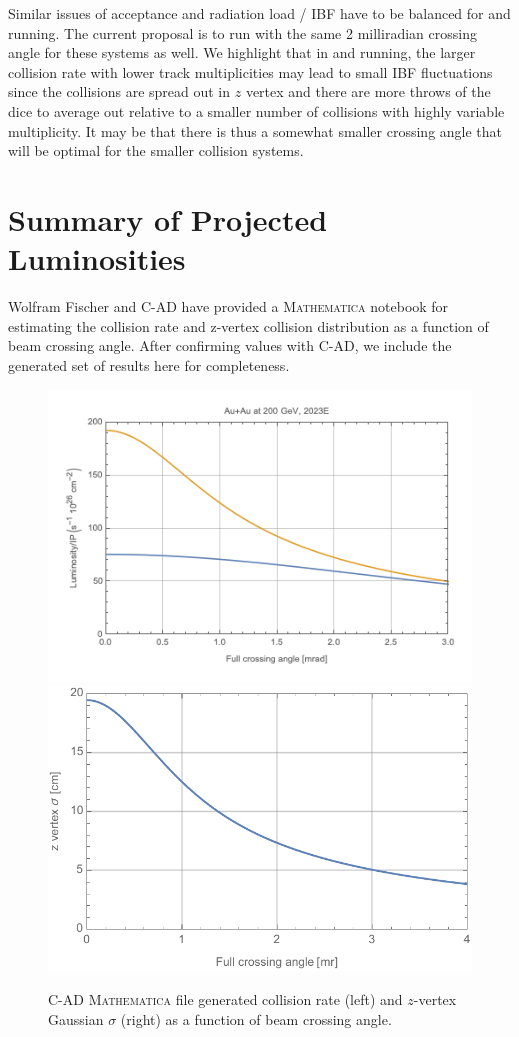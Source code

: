 Similar issues of acceptance and radiation load / IBF have to be balanced for \pp and \pau running.   The current proposal is to run with the same 2 milliradian crossing angle for these systems as well.    We highlight that in \pp and \pau running, the larger collision rate with lower track multiplicities may lead to small IBF fluctuations since the collisions are spread out in $z$ vertex and there are more throws of the dice to average out relative to a smaller number of \auau collisions with highly variable multiplicity.     It may be that there is thus a somewhat smaller crossing angle that will be optimal for the smaller collision systems.    

\section{Summary of Projected Luminosities} 

Wolfram Fischer and C-AD have provided a {\textsc{Mathematica}} notebook for estimating the collision rate and z-vertex collision distribution as a function of beam crossing angle.  After confirming values with C-AD, we include the generated set of results here for completeness.    

\begin{figure}[h!]
    \centering
        \includegraphics[width=0.47\linewidth]{figs/figure_cad1_prelim.png}  
    \includegraphics[width=0.43\linewidth]{figs/auau200-2023-202008131-z.pdf}
    \caption{C-AD {\textsc{Mathematica}} file generated \auau collision rate (left) and $z$-vertex Gaussian $\sigma$ (right) as a function of beam crossing angle.}
    \label{fig:mathauau1}
\end{figure}

